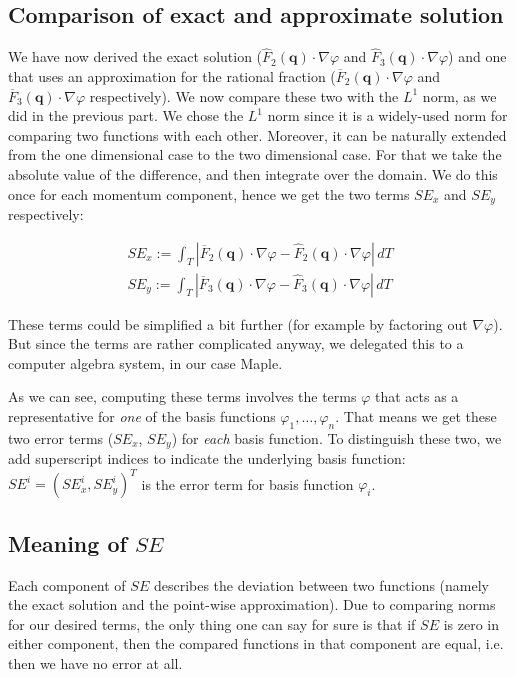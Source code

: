\documentclass[a4paper, twoside]{article}
\renewcommand{\phi}{\varphi}
\begin{document}
\subsection{Comparison of exact and approximate solution}

We have now derived the exact solution ($\widehat{F}_2(\mathbf{q}) \cdot \nabla \phi$ and $\widehat{F}_3(\mathbf{q}) \cdot \nabla \phi$) and one that uses an approximation for the rational fraction ($\overline{F}_2(\mathbf{q}) \cdot \nabla \phi$ and $\overline{F}_3(\mathbf{q}) \cdot \nabla \phi$ respectively). We now compare these two with the $L^1$ norm, as we did in the previous part. We chose the $L^1$ norm since it is a widely-used norm for comparing two functions with each other. Moreover, it can be naturally extended from the one dimensional case to the two dimensional case. For that we take the absolute value of the difference, and then integrate over the domain. We do this once for each momentum component, hence we get the two terms $SE_x$ and $SE_y$ respectively:

\begin{eqnarray*}
  SE_x := \int_T \left| \overline{F}_2(\mathbf{q}) \cdot \nabla \phi - \widehat{F}_2(\mathbf{q}) \cdot \nabla \phi \right| \, dT\\
  SE_y := \int_T \left| \overline{F}_3(\mathbf{q}) \cdot \nabla \phi - \widehat{F}_3(\mathbf{q}) \cdot \nabla \phi \right| \, dT
\end{eqnarray*}

These terms could be simplified a bit further (for example by factoring out $\nabla \phi$). But since the terms are rather complicated anyway, we delegated this to a computer algebra system, in our case Maple.

As we can see, computing these terms involves the terms $\phi$ that acts as a representative for \emph{one} of the basis functions $\phi_1,\dots,\phi_n$. That means we get these two error terms ($SE_x$, $SE_y$) for \emph{each} basis function. To distinguish these two, we add superscript indices to indicate the underlying basis function: $SE^i= \left(SE_x^i, SE_y^i\right)^T$ is the error term for basis function $\phi_i$.

\subsection{\texorpdfstring{Meaning of $SE$}{Meaning of SE}}
\label{sec:stiffness-analysis-what-does-se-mean}

Each component of $SE$ describes the deviation between two functions (namely the exact solution and the point-wise approximation). Due to comparing norms for our desired terms, the only thing one can say for sure is that if $SE$ is zero in either component, then the compared functions in that component are equal, i.e.\,then we have no error at all.
\end{document}
